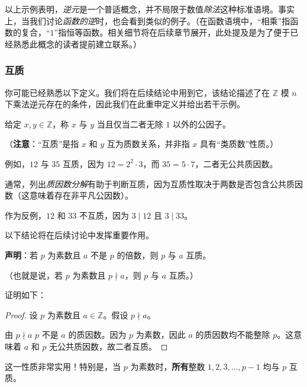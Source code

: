以上示例表明，\emph{逆元}是一个普适概念，并不局限于数值\emph{除法}这种标准语境。事实上，当我们讨论\emph{函数的逆}时，也会看到类似的例子。（在函数语境中，``相乘''指函数的复合，``$1$''指恒等函数。相关细节将在后续章节展开，此处提及是为了便于已经熟悉此概念的读者提前建立联系。）

\subsubsection*{互质}

你可能已经熟悉以下定义。我们将在后续结论中用到它，该结论描述了在 $\mathbb{Z}$ 模 $n$ 下乘法逆元存在的条件，因此我们在此重申定义并给出若干示例。

\begin{definition}
    给定 $x,y \in \mathbb{Z}$，称 $x$ 与 $y$ 当且仅当二者无除 $1$ 以外的公因子。
\end{definition}

（\textbf{注意}：``互质''是指 $x$ 和 $y$ 互为质数关系，并非指 $x$ 具有``类质数''性质。）

\begin{example}
    例如，$12$ 与 $35$ 互质，因为 $12 = 2^2 \cdot 3$，而 $35 = 5 \cdot 7$，二者无公共质因数。

    通常，列出\emph{质因数分解}有助于判断互质，因为互质性取决于两数是否包含公共质因数（这意味着存在非平凡公因数）。

    作为反例，$12$ 和 $33$ 不互质，因为 $3 \mid 12$ 且 $3 \mid 33$。
\end{example}

\begin{example}
    以下结论将在后续讨论中发挥重要作用。

    \textbf{声明}：若 $p$ 为素数且 $a$ 不是 $p$ 的倍数，则 $p$ 与 $a$ 互质。

    （也就是说，若 $p$ 为素数且 $p \nmid a$，则 $p$ 与 $a$ 互质。）

    证明如下：

    \begin{proof}
        设 $p$ 为素数且 $a \in \mathbb{Z}$。假设 $p \nmid a$。

        由 $p \nmid a$ $p$ 不是 $a$ 的质因数。因为 $p$ 为素数，因此 $a$ 的质因数均不能整除 $p$。这意味着 $a$ 和 $p$ 无公共质因数，故二者互质。
    \end{proof}

    这一性质非常实用！特别是，当 $p$ 为素数时，\textbf{所有}整数 $1, 2, 3, \dots , p-1$ 均与 $p$ 互质。
\end{example}

